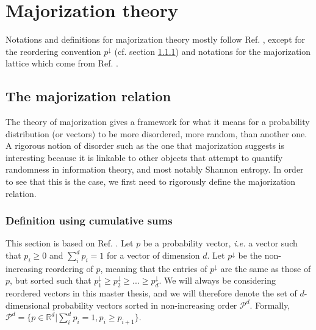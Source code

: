 \chapter{Majorization theory} \label{chap:majorization}

Notations and definitions for majorization theory mostly follow Ref. \cite{marshall_inequalities_2011}, except for the reordering convention $p^\downarrow$ (cf. section \ref{sec:cumulative}) and notations for the majorization lattice which come from Ref. \cite{cicalese_supermodularity_2002}.



\section{The majorization relation} \label{sec:majorization}

The theory of majorization gives a framework for what it means for a probability distribution (or vectors) to be more disordered, more random, than another one. A rigorous notion of disorder such as the one that majorization suggests is interesting because it is linkable to other objects that attempt to quantify randomness in information theory, and most notably Shannon entropy. In order to see that this is the case, we first need to rigorously define the majorization relation.



\subsection{Definition using cumulative sums} \label{sec:cumulative}

This section is based on Ref. \cite[pp. 4--10]{marshall_inequalities_2011}. Let $p$ be a probability vector, \textit{i.e.} a vector such that $p_i \geq 0$ and $\sum_{i}^{d} p_i = 1$ for a vector of dimension $d$. Let $p^\downarrow$ be the non-increasing reordering of $p$, meaning that the entries of $p^\downarrow$ are the same as those of $p$, but sorted such that $p^\downarrow_1 \geq p^\downarrow_2 \geq ... \geq p^\downarrow_d$. We will always be considering reordered vectors in this master thesis, and we will therefore denote the set of $d$-dimensional probability vectors sorted in non-increasing order $\mathcal{P}^d$. Formally, $\mathcal{P}^d = \{p \in \mathbb{R}^d | \sum_{i}^{d} p_i = 1, p_i \geq p_{i+1}\}$.

